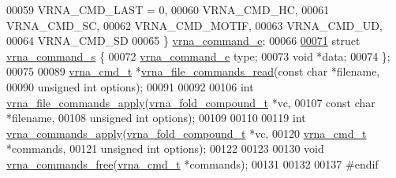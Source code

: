 \begin{DoxyCode}
00059   VRNA\_CMD\_LAST   = 0,
00060   VRNA\_CMD\_HC,
00061   VRNA\_CMD\_SC,
00062   VRNA\_CMD\_MOTIF,
00063   VRNA\_CMD\_UD,
00064   VRNA\_CMD\_SD
00065 \} \hyperlink{group__file__utils_ga2ea3e452bf3b3f3ca513b3b081a86137}{vrna\_command\_e};
00066 
\hyperlink{group__file__utils}{00071} \textcolor{keyword}{struct }\hyperlink{group__file__utils_structvrna__command__s}{vrna\_command\_s} \{
00072   \hyperlink{group__file__utils_ga2ea3e452bf3b3f3ca513b3b081a86137}{vrna\_command\_e}  type;
00073   \textcolor{keywordtype}{void}            *data;
00074 \};
00075 
00089 \hyperlink{group__file__utils_structvrna__command__s}{vrna\_cmd\_t} *\hyperlink{group__file__utils_ga5d2a64331cff5b1059e7d327545d8a63}{vrna\_file\_commands\_read}(\textcolor{keyword}{const} \textcolor{keywordtype}{char}    *filename,
00090                                     \textcolor{keywordtype}{unsigned} \textcolor{keywordtype}{int}  options);
00091 
00092 
00106 \textcolor{keywordtype}{int} \hyperlink{group__file__utils_gadbe8c9622f7bcc6dcbe3448b98df8656}{vrna\_file\_commands\_apply}(\hyperlink{group__fold__compound_structvrna__fc__s}{vrna\_fold\_compound\_t} *vc,
00107                              \textcolor{keyword}{const} \textcolor{keywordtype}{char}           *filename,
00108                              \textcolor{keywordtype}{unsigned} \textcolor{keywordtype}{int}         options);
00109 
00110 
00119 \textcolor{keywordtype}{int} \hyperlink{group__file__utils_ga5e993fc4b9602af73aaaab4d3b3cd9a9}{vrna\_commands\_apply}(\hyperlink{group__fold__compound_structvrna__fc__s}{vrna\_fold\_compound\_t}  *vc,
00120                         \hyperlink{group__file__utils_structvrna__command__s}{vrna\_cmd\_t}            *commands,
00121                         \textcolor{keywordtype}{unsigned} \textcolor{keywordtype}{int}          options);
00122 
00123 
00130 \textcolor{keywordtype}{void} \hyperlink{group__file__utils_ga926fd7632e68f3da2e2069402b80b1ab}{vrna\_commands\_free}(\hyperlink{group__file__utils_structvrna__command__s}{vrna\_cmd\_t} *commands);
00131 
00132 
00137 \textcolor{preprocessor}{#endif}
\end{DoxyCode}
